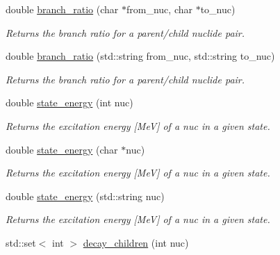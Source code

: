 \begin{DoxyCompactItemize}
\mbox{\label{namespacepyne_abef13981249047d7678dc448db101ef4}} 
double \hyperlink{namespacepyne_abef13981249047d7678dc448db101ef4}{branch\+\_\+ratio} (char $\ast$from\+\_\+nuc, char $\ast$to\+\_\+nuc)
\begin{DoxyCompactList}\small\item\em Returns the branch ratio for a parent/child nuclide pair. \end{DoxyCompactList}\item 
\mbox{\label{namespacepyne_a5a77a005a47c8c2a421484f17acdec0d}} 
double \hyperlink{namespacepyne_a5a77a005a47c8c2a421484f17acdec0d}{branch\+\_\+ratio} (std\+::string from\+\_\+nuc, std\+::string to\+\_\+nuc)
\begin{DoxyCompactList}\small\item\em Returns the branch ratio for a parent/child nuclide pair. \end{DoxyCompactList}\item 
double \hyperlink{namespacepyne_ada1a23281a3a62267fbd355bd48da2e6}{state\+\_\+energy} (int nuc)
\begin{DoxyCompactList}\small\item\em Returns the excitation energy \mbox{[}MeV\mbox{]} of a {\itshape nuc} in a given state. \end{DoxyCompactList}\item 
\mbox{\label{namespacepyne_afbe96cec07719bac2b5fe3ad299b1dd1}} 
double \hyperlink{namespacepyne_afbe96cec07719bac2b5fe3ad299b1dd1}{state\+\_\+energy} (char $\ast$nuc)
\begin{DoxyCompactList}\small\item\em Returns the excitation energy \mbox{[}MeV\mbox{]} of a {\itshape nuc} in a given state. \end{DoxyCompactList}\item 
\mbox{\label{namespacepyne_a1e1a4d494979a9aedce584c054474ae0}} 
double \hyperlink{namespacepyne_a1e1a4d494979a9aedce584c054474ae0}{state\+\_\+energy} (std\+::string nuc)
\begin{DoxyCompactList}\small\item\em Returns the excitation energy \mbox{[}MeV\mbox{]} of a {\itshape nuc} in a given state. \end{DoxyCompactList}\item 
std\+::set$<$ int $>$ \hyperlink{namespacepyne_a97a5a09f509c1eb64e5be5ed8e5de56d}{decay\+\_\+children} (int nuc)

\end{DoxyCompactItemize}
